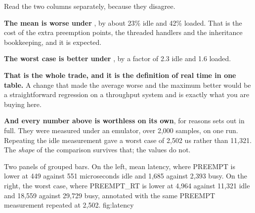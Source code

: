 \noindent Read the two columns separately, because they disagree.

\textbf{The mean is worse under }, by about 23\% idle and 42\% loaded. That is the
cost of the extra preemption points, the threaded handlers and the inheritance bookkeeping, and it
is expected.

\textbf{The worst case is better under }, by a factor of 2.3 idle and 1.6 loaded.

\textbf{That is the whole trade, and it is the definition of real time in one table.} A change that
made the average worse and the maximum better would be a straightforward regression on a throughput
system and is exactly what you are buying here.

\textbf{And every number above is worthless on its own}, for reasons  sets out in
full. They were measured under an emulator, over 2,000 samples, on one run. Repeating the idle
 measurement gave a worst case of 2,502 us rather than 11,321. The \emph{shape} of the
comparison survives that; the values do not.

  {Two panels of grouped bars. On the left, mean latency, where PREEMPT is lower at 449 against 551
   microseconds idle and 1,685 against 2,393 busy. On the right, the worst case, where PREEMPT\_RT
   is lower at 4,964 against 11,321 idle and 18,559 against 29,729 busy, annotated with the same
   PREEMPT measurement repeated at 2,502.}
  {fig:latency}
